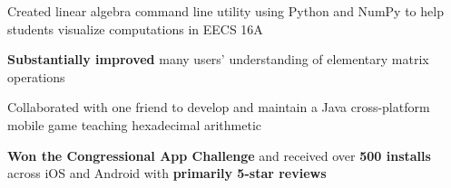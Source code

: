 \documentclass[]{deedy-resume-openfont}
\begin{document}
\begin{minipage}[t]{0.66\textwidth}
\begin{tightemize}
\item Created linear algebra command line utility using Python and NumPy to help students visualize computations in EECS 16A
\item \textbf{Substantially improved} many users' understanding of elementary matrix operations
\end{tightemize}
\sectionsep

\begin{tightemize}
\item Collaborated with one friend to develop and maintain a Java cross-platform mobile game teaching hexadecimal arithmetic
\item \textbf{Won the Congressional App Challenge} and received over \textbf{500 installs} across iOS and Android with \textbf{primarily 5-star reviews}
\end{tightemize}
\sectionsep

\end{minipage} 
\end{document}
